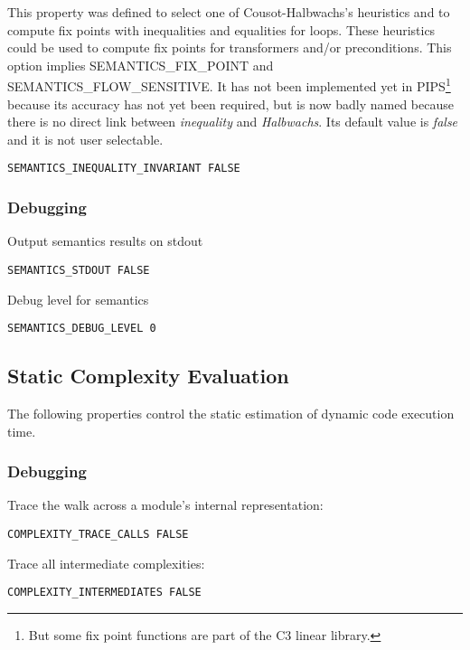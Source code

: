 This property was defined to select one of Cousot-Halbwachs's heuristics
and to compute fix points with inequalities and equalities for loops.
These heuristics could be used to compute fix points for transformers
and/or preconditions. This option implies SEMANTICS\_FIX\_POINT and
SEMANTICS\_FLOW\_SENSITIVE.  It has not been implemented yet in
PIPS\footnote{But some fix point functions are part of the C3 linear
  library.} because its accuracy has not yet been required, but is now
badly named because there is no direct link between {\em inequality} and
{\em Halbwachs}. Its default value is {\em false} and it is not user
selectable.

\begin{verbatim}
SEMANTICS_INEQUALITY_INVARIANT FALSE
\end{verbatim}

\subsubsection{Debugging}

Output semantics results on stdout

\begin{verbatim}
SEMANTICS_STDOUT FALSE
\end{verbatim}

Debug level for semantics

\begin{verbatim}
SEMANTICS_DEBUG_LEVEL 0
\end{verbatim}

\subsection{Static Complexity Evaluation}

The following properties control the static estimation of dynamic code
execution time.

\subsubsection{Debugging}

Trace the walk across a module's internal representation:

\begin{verbatim}
COMPLEXITY_TRACE_CALLS FALSE
\end{verbatim}

Trace all intermediate complexities:

\begin{verbatim}
COMPLEXITY_INTERMEDIATES FALSE
\end{verbatim}

